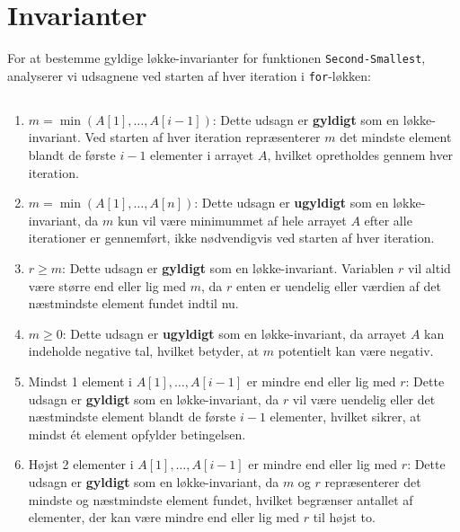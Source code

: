 \documentclass{article}
\begin{document}
\section{Invarianter}

For at bestemme gyldige løkke-invarianter for funktionen \texttt{Second-Smallest}, analyserer vi udsagnene ved starten af hver iteration i \texttt{for}-løkken:

\subsection{}


\begin{enumerate}
    \item \( m = \min(A[1], \ldots, A[i-1]) \): Dette udsagn er \textbf{gyldigt} som en løkke-invariant. Ved starten af hver iteration repræsenterer \( m \) det mindste element blandt de første \( i-1 \) elementer i arrayet \( A \), hvilket opretholdes gennem hver iteration.
    \item \( m = \min(A[1], \ldots, A[n]) \): Dette udsagn er \textbf{ugyldigt} som en løkke-invariant, da \( m \) kun vil være minimummet af hele arrayet \( A \) efter alle iterationer er gennemført, ikke nødvendigvis ved starten af hver iteration.
    \item \( r \geq m \): Dette udsagn er \textbf{gyldigt} som en løkke-invariant. Variablen \( r \) vil altid være større end eller lig med \( m \), da \( r \) enten er uendelig eller værdien af det næstmindste element fundet indtil nu.
    \item \( m \geq 0 \): Dette udsagn er \textbf{ugyldigt} som en løkke-invariant, da arrayet \( A \) kan indeholde negative tal, hvilket betyder, at \( m \) potentielt kan være negativ.
    \item Mindst 1 element i \( A[1], \ldots, A[i-1] \) er mindre end eller lig med \( r \): Dette udsagn er \textbf{gyldigt} som en løkke-invariant, da \( r \) vil være uendelig eller det næstmindste element blandt de første \( i-1 \) elementer, hvilket sikrer, at mindst ét element opfylder betingelsen.
    \item Højst 2 elementer i \( A[1], \ldots, A[i-1] \) er mindre end eller lig med \( r \): Dette udsagn er \textbf{gyldigt} som en løkke-invariant, da \( m \) og \( r \) repræsenterer det mindste og næstmindste element fundet, hvilket begrænser antallet af elementer, der kan være mindre end eller lig med \( r \) til højst to.
\end{enumerate}
\end{document}

